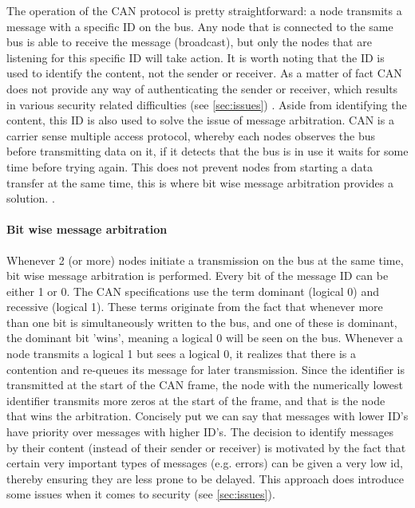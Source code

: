 \documentclass[11pt]{article}
\begin{document}
The operation of the CAN protocol is pretty straightforward: a node transmits a message with a specific ID on the bus. Any node that is connected to the same bus is able to receive the message (broadcast), but only the nodes that are listening for this specific ID will take action. It is worth noting that the ID is used to identify the content, not the sender or receiver. As a matter of fact CAN does not provide any way of authenticating the sender or receiver, which results in various security related difficulties (see \ref{sec:issues}) . Aside from identifying the content, this ID is also used to solve the issue of message arbitration. CAN is a carrier sense multiple access protocol, whereby each nodes observes the bus before transmitting data on it, if it detects that the bus is in use it waits for some time before trying again. This does not prevent nodes from starting a data transfer at the same time, this is where bit wise message arbitration provides a solution. \cite{CANarbitration}.

\paragraph{Bit wise message arbitration}

Whenever 2 (or more) nodes initiate a transmission on the bus at the same time, bit wise message arbitration is performed. Every bit of the message ID can be either 1 or 0. The CAN specifications use the term dominant (logical 0) and recessive (logical 1). These terms originate from the fact that whenever more than one bit is simultaneously written to the bus, and one of these is dominant, the dominant bit 'wins', meaning a logical 0 will be seen on the bus. Whenever a node transmits a logical 1 but sees a logical 0, it realizes that there is a contention and re-queues its message for later transmission. Since the identifier is transmitted at the start of the CAN frame, the node with the numerically lowest identifier transmits more zeros at the start of the frame, and that is the node that wins the arbitration. Concisely put we can say that messages with lower ID's have priority over messages with higher ID's. The decision to identify messages by their content (instead of their sender or receiver) is motivated by the fact that certain very important types of messages (e.g. errors) can be given a very low id, thereby ensuring they are less prone to be delayed. This approach does introduce some issues when it comes to security (see \ref{sec:issues}).
\end{document}
